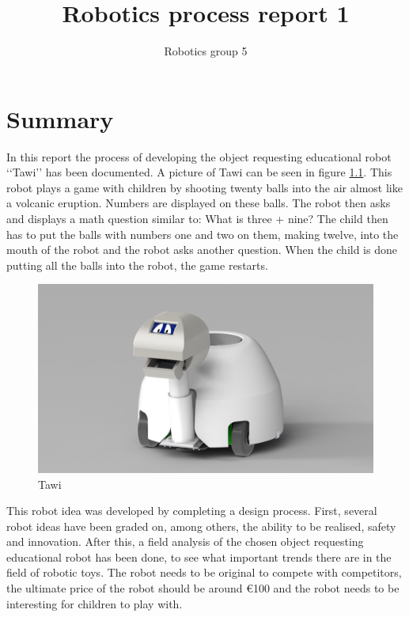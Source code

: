 \documentclass[11pt,twoside,a4paper]{report}
\begin{document}
\title{Robotics process report 1}
\author{Robotics group 5}

\tableofcontents

\chapter{Summary}
In this report the process of developing the object requesting educational robot \lq\lq{}Tawi\rq\rq{} has been documented. A picture of Tawi can be seen in figure \ref{fig:summRender}. This robot plays a game with children by shooting twenty balls into the air almost like a volcanic eruption. Numbers are displayed on these balls. The robot then asks and displays a math question similar to: What is three + nine? The child then has to put the balls with numbers one and two on them, making twelve, into the mouth of the robot and the robot asks another question. When the child is done putting all the balls into the robot, the game restarts. \\
 
\begin{figure}[H]
\begin{center}
\includegraphics[width=14cm]{Images/RenderAnne1.JPG}
\caption{ Tawi}
\label{fig:summRender}
\end{center}
\end{figure}
 
This robot idea was developed by completing a design process. First, several robot ideas have been graded on, among others, the ability to be realised, safety and innovation.  After this, a field analysis of the chosen object requesting educational robot has been done, to see what important trends there are in the field of robotic toys. The robot needs to be original to compete with competitors, the ultimate price of the robot should be around €100 and the robot needs to be interesting for children to play with.   \\
  
\end{document}
